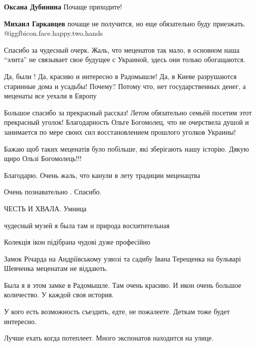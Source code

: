 \begin{itemize}
\begin{itemize}
\textbf{Оксана Дубинина} Почаще приходите!

\textbf{Михаил Гаркавцев} почаще не получится, но еще обязательно буду приезжать.  @igg{fbicon.face.happy.two.hands} 
\end{itemize} %


Спасибо за чудесный очерк. Жаль, что меценатов так мало, в основном наша
\enquote{элита} не связывает свое будущее с Украиной, здесь они только обогащаются.


Да, были ! Да, красиво и интересно в Радомышле! Да, в Киеве разрушаются
старинные дома и усадьбы! Почему? Потому что, нет государственных денег, а
меценаты все уехали в Европу


Большое спасибо за прекрасный рассказ! Летом обязательно семьёй посетим этот
прекрасный уголок! Благодарность Ольге Богомолец, что не очерствела душой и
занимается по мере своих сил восстановлением прошлого уголков Украины!


Бажаю щоб таких меценатів було побільше, які зберігають нашу історію. Дякую
щиро Ользі Богомолець!!!

Благодарю. Очень жаль, что канули в лету традиции меценацтва

Очень познавательно . Спасибо.

ЧЕСТЬ И ХВАЛА. Умница

чудесный музей я была там и природа восхитительная

Колекція ікон підібрана чудові дуже професійно

Замок Річарда на Андріївському узвозі та садибу Івана Терещенка на бульварі Шевченка меценатам не віддають.


Была я в этом замке в Радомышле. Там очень красиво. И икон очень большое
количество. У каждой своя история.

У кого есть возможность съездить, едте, не пожалеете. Деткам тоже будет
интересно.

Лучше ехать когда потеплеет. Много экспонатов находится на улице.



\end{itemize}
